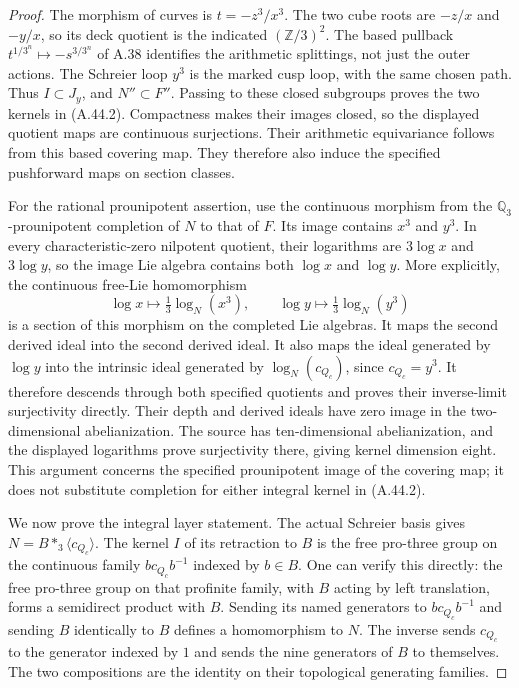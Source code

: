 \begin{proof}
The morphism of curves is $t=-z^3/x^3$.
The two cube roots are $-z/x$ and $-y/x$, so its deck
quotient is the indicated $(\mathbb Z/3)^2$. The based
pullback $t^{1/3^n}\mapsto-s^{3/3^n}$ of A.38 identifies
the arithmetic splittings, not just the outer actions.
The Schreier loop $y^3$ is the marked cusp loop, with
the same chosen path. Thus $I\subset J_y$, and
$N''\subset F''$. Passing to these closed subgroups
proves the two kernels in (A.44.2). Compactness makes
their images closed, so the displayed quotient maps
are continuous surjections. Their arithmetic
equivariance follows from this based covering map.
They therefore also induce the specified pushforward
maps on section classes.

For the rational prounipotent assertion, use the
continuous morphism from the $\mathbb Q_3$-prounipotent
completion of $N$ to that of $F$. Its image contains
$x^3$ and $y^3$. In every characteristic-zero nilpotent
quotient, their logarithms are $3\log x$ and
$3\log y$, so the image Lie algebra contains both
$\log x$ and $\log y$. More explicitly, the continuous
free-Lie homomorphism
\[
 \log x\longmapsto\tfrac13\log_N(x^3),\qquad
 \log y\longmapsto\tfrac13\log_N(y^3)
\]
is a section of this morphism on the completed Lie
algebras. It maps the second derived ideal into the
second derived ideal. It also maps the ideal generated
by $\log y$ into the intrinsic ideal generated by
$\log_N(c_{Q_c})$, since $c_{Q_c}=y^3$.
It therefore descends through both specified quotients
and proves their inverse-limit surjectivity directly.
Their depth and derived
ideals have zero image in the two-dimensional
abelianization. The source has ten-dimensional
abelianization, and the displayed logarithms prove
surjectivity there, giving kernel dimension eight.
This argument concerns the specified prounipotent
image of the covering map; it does not substitute
completion for either integral kernel in (A.44.2).

We now prove the integral layer statement. The actual
Schreier basis gives $N=B*_3\langle c_{Q_c}\rangle$.
The kernel $I$ of its retraction to $B$ is the free
pro-three group on the continuous family
$b c_{Q_c}b^{-1}$ indexed by $b\in B$. One can verify
this directly: the free pro-three group on that
profinite family, with $B$ acting by left translation,
forms a semidirect product with $B$. Sending its
named generators to $b c_{Q_c}b^{-1}$ and sending
$B$ identically to $B$ defines a homomorphism to $N$.
The inverse sends $c_{Q_c}$ to the generator indexed
by $1$ and sends the nine generators of $B$ to
themselves. The two compositions are the identity
on their topological generating families.


\end{proof}
